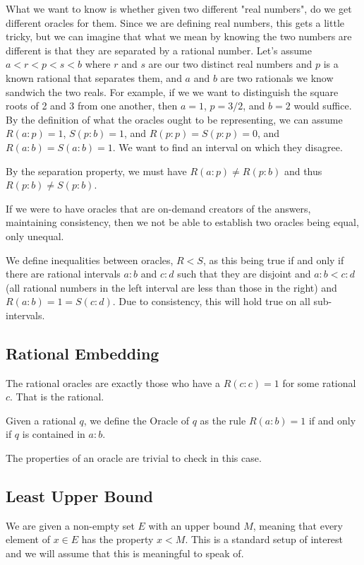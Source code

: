 \documentclass[12pt]{article}
\begin{document}
What we want to know is whether given two different "real numbers", do we get different oracles for them. Since we are defining real numbers, this gets a little tricky, but we can imagine that what we mean by knowing the two numbers are different is that they are separated by a rational number. Let's assume $a < r < p < s < b$ where $r$ and $s$ are our two distinct real numbers and $p$ is a known rational that separates them, and $a$ and $b$ are two rationals we know sandwich the two reals. For example, if we we want to distinguish the square roots of 2 and 3 from one another, then $a = 1$, $p = 3/2$, and $b = 2$ would suffice. By the definition of what the oracles ought to be representing, we can assume $R(a:p) = 1$, $S(p:b) = 1$, and $R(p:p) = S(p:p) = 0$, and $R(a:b)=S(a:b) = 1$. We want to find an interval on which they disagree. 

By the separation property, we must have $R(a:p) \neq R(p:b)$ and thus $R(p:b) \neq S(p:b)$. 

If we were to have oracles that are on-demand creators of the answers, maintaining consistency, then we not be able to establish two oracles being equal, only unequal. 

We define inequalities between oracles, $R < S$, as this being true if and only if there are rational intervals $a:b$ and $c:d$ such that they are disjoint and $a:b < c:d$ (all rational numbers in the left interval are less than those in the right) and $R(a:b) = 1 = S(c:d)$. Due to consistency, this will hold true on all sub-intervals. 

\subsection{Rational Embedding}

The rational oracles are exactly those who have a $R(c:c)=1$ for some rational $c$. That is the rational.

Given a rational $q$, we define the Oracle of $q$ as the rule $R(a:b) = 1$ if and only if $q$ is contained in $a:b$. 

The properties of an oracle are trivial to check in this case. 



\subsection{Least Upper Bound}

We are given a non-empty set $E$ with an upper bound $M$, meaning that every element of $x \in E$ has the property $x < M$. This is a standard setup of interest and we will assume that this is meaningful to speak of.
\end{document}
